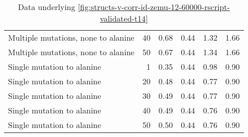 \begin{table}
\begin{tabular}{lrrrrr}
 Multiple mutations, none to alanine &            40 &          0.68 &                    0.44 &            1.32 &                      1.66 \\
 Multiple mutations, none to alanine &            50 &          0.67 &                    0.44 &            1.34 &                      1.66 \\
          Single mutation to alanine &             1 &          0.35 &                    0.44 &            0.98 &                      0.90 \\
          Single mutation to alanine &            20 &          0.48 &                    0.44 &            0.77 &                      0.90 \\
          Single mutation to alanine &            30 &          0.49 &                    0.44 &            0.77 &                      0.90 \\
          Single mutation to alanine &            40 &          0.49 &                    0.44 &            0.76 &                      0.90 \\
          Single mutation to alanine &            50 &          0.50 &                    0.44 &            0.76 &                      0.90 \\
\bottomrule
\end{tabular}

\caption[]{Data underlying \cref{fig:structs-v-corr-id-zemu-12-60000-rscript-validated-t14}}
\label{tab:structs-v-corr-id-zemu-12-60000-rscript-validated-t14-underlying-data}
\end{table}
